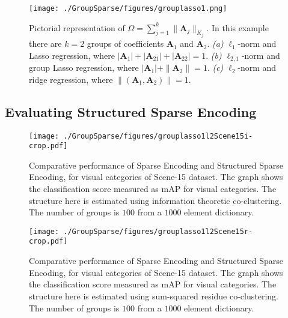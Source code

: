 \begin{figure}
 \centering
 \texttt{[image: ./GroupSparse/figures/grouplasso1.png]}
 \caption[Pictorial representation of sparse regularization]{Pictorial representation of $\Omega = \sum_{j=1}^{k} \parallel \mathbf{A}_{j} \parallel_{K_{j}}$. In this example there are $k = 2$ groups of coefficients $\mathbf{A}_{1}$ and $\mathbf{A}_{2}$. \textit{(a)} $\ell_{1}$-norm and Lasso regression, where $|\mathbf{A}_{1}| + |\mathbf{A}_{21}|+ |\mathbf{A}_{22}| = 1$. \textit{(b)} $\ell_{2,1}$-norm and group Lasso regression, where $ |\mathbf{A}_{1}| + \parallel \mathbf{A}_{2} \parallel = 1$. \textit{(c)} $\ell_{2}$-norm and ridge regression, where $\parallel (\mathbf{A}_{1}, \mathbf{A}_{2}) \parallel = 1$.}
 \label{fig:groupLasso}
\end{figure}

\subsection[Evaluating Structured Encoding]{Evaluating Structured Sparse Encoding}
\label{ch_groupsparse_subsec_eval_structuredencoding}

\begin{figure}
 \centering
 \texttt{[image: ./GroupSparse/figures/grouplasso1l2Scene15i-crop.pdf]}
 \caption[Comparison of sparse and ITCC structured sparse coding using Scene-15 dataset]{Comparative performance of Sparse Encoding and Structured Sparse Encoding, for visual categories of Scene-15 dataset. The graph shows the classification score measured as mAP for visual categories. The structure here is estimated using information theoretic co-clustering. The number of groups is $100$ from a $1000$ element dictionary.}
 \label{fig:groupLassoScene15i}
\end{figure}

\begin{figure}
 \centering
 \texttt{[image: ./GroupSparse/figures/grouplasso1l2Scene15r-crop.pdf]}
 \caption[Comparison of sparse and SSRCC structured sparse coding using Scene-15 dataset]{Comparative performance of Sparse Encoding and Structured Sparse Encoding, for visual categories of Scene-15 dataset. The graph shows the classification score measured as mAP for visual categories. The structure here is estimated using sum-squared residue co-clustering. The number of groups is $100$ from a $1000$ element dictionary.}
 \label{fig:groupLassoScene15r}
\end{figure}

